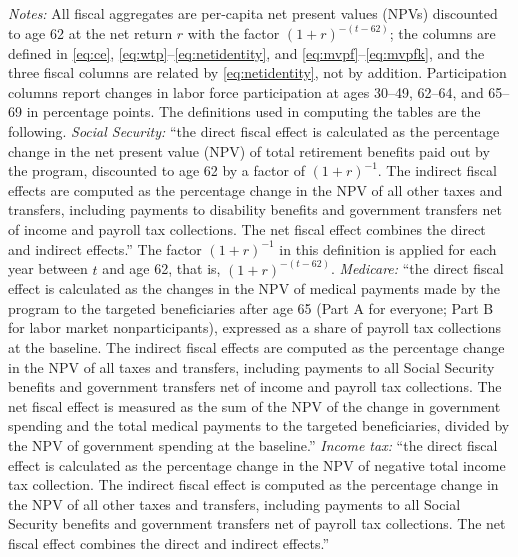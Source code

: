 \begin{table}[!t]
\begin{threeparttable}
\begin{tablenotes}[flushleft]\scriptsize
\item[] \textit{Notes:} All fiscal aggregates are per-capita net present values (NPVs) discounted to age 62 at the net return $r$ with the factor $(1+r)^{-(t-62)}$; the columns are defined in \eqref{eq:ce}, \eqref{eq:wtp}--\eqref{eq:netidentity}, and \eqref{eq:mvpf}--\eqref{eq:mvpfk}, and the three fiscal columns are related by \eqref{eq:netidentity}, not by addition. Participation columns report changes in labor force participation at ages 30--49, 62--64, and 65--69 in percentage points. The definitions used in computing the tables are the following.
\emph{Social Security:} ``the direct fiscal effect is calculated as the percentage change in the net present value (NPV) of total retirement benefits paid out by the program, discounted to age 62 by a factor of $(1+r)^{-1}$. The indirect fiscal effects are computed as the percentage change in the NPV of all other taxes and transfers, including payments to disability benefits and government transfers net of income and payroll tax collections. The net fiscal effect combines the direct and indirect effects.'' The factor $(1+r)^{-1}$ in this definition is applied for each year between $t$ and age 62, that is, $(1+r)^{-(t-62)}$.
\emph{Medicare:} ``the direct fiscal effect is calculated as the changes in the NPV of medical payments made by the program to the targeted beneficiaries after age 65 (Part A for everyone; Part B for labor market nonparticipants), expressed as a share of payroll tax collections at the baseline. The indirect fiscal effects are computed as the percentage change in the NPV of all taxes and transfers, including payments to all Social Security benefits and government transfers net of income and payroll tax collections. The net fiscal effect is measured as the sum of the NPV of the change in government spending and the total medical payments to the targeted beneficiaries, divided by the NPV of government spending at the baseline.''
\emph{Income tax:} ``the direct fiscal effect is calculated as the percentage change in the NPV of negative total income tax collection. The indirect fiscal effect is computed as the percentage change in the NPV of all other taxes and transfers, including payments to all Social Security benefits and government transfers net of payroll tax collections. The net fiscal effect combines the direct and indirect effects.''

\end{tablenotes}
\end{threeparttable}
\end{table}
